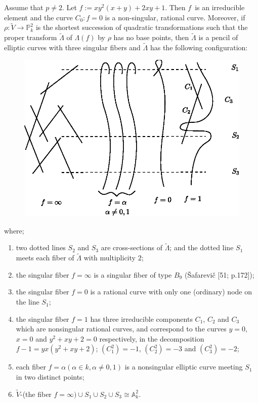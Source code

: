 \begin{example*}
Assume that $p\neq 2$. Let $f:=xy^{2}(x+y)+2xy+1$. Then
$f$\pageoriginale\ is an irreducible element and the curve $C_{0}:f=0$
is a non-singular, rational curve. Moreover, if $\rho:\widetilde{V}\to
\mathbb{P}^{2}_{k}$ is the shortest succession of quadratic
transformations such that the proper transform $\widetilde{\Lambda}$
of $\Lambda(f)$ by $\rho$ has no base points, then
$\widetilde{\Lambda}$ is a pencil of elliptic curves with three
singular fibers and $\widetilde{\Lambda}$ has the following
configuration:
\begin{figure}[H]
\centering
\includegraphics[scale=.8]{figures/chap2-fig1.eps}
\end{figure}
\noindent
where;
\begin{enumerate}
\itemsep=3pt
\renewcommand{\labelenumi}{\theenumi$^{\circ}$}
\item two dotted lines $S_{2}$ and $S_{3}$ are cross-sections of
  $\widetilde{\Lambda}$; and the dotted line $S_{1}$ meets each fiber
  of $\widetilde{\Lambda}$ with multiplicity $2$;  


\item the singular fiber $f=\infty$ is a singular fiber of type
  $B_{9}$ (\cf \v{S}afarevi\v{c} [51; p.\@ 172]);

\item the singular fiber $f=0$ is a rational curve with only one
  (ordinary) node on the line $S_{1}$;

\item the singular fiber $f=1$ has three irreducible components
  $C_{1}$, $C_{2}$ and $C_{3}$ which are nonsingular rational curves,
  and correspond to the curves $y=0$, $x=0$ and $y^{2}+xy+2=0$
  respectively, in the decomposition\pageoriginale\
  $f-1=yx (y^{2}+xy+2)$; $(C^{2}_{1})=-1$, $(C^{2}_{2})=-3$ and
  $(C^{2}_{3})=-2$; 

\item each fiber $f=\alpha(\alpha\in k, \alpha\neq 0,1)$ is a
  nonsingular elliptic curve meeting $S_{1}$ in two distinct points;

\item $\widetilde{V}$-(the fiber $f=\infty)\cup S_{1}\cup S_{2}\cup
  S_{3}\cong \mathbb{A}^{2}_{k}$.
\end{enumerate}
\end{example*}

